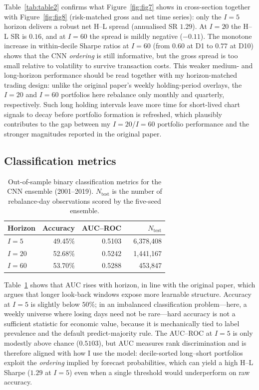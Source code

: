 \documentclass{article}
\begin{document}
Table~\ref{tab:table2} confirms what Figure~\ref{fig:fig7} shows in cross-section together with Figure~\ref{fig:fig8} (risk-matched gross and net time series): only the $I=5$
horizon delivers a
robust net H--L spread (annualised SR $1.29$). At $I=20$ the H--L SR is
$0.16$, and at $I=60$ the spread is mildly negative ($-0.11$). The
monotone increase in within-decile Sharpe ratios at $I=60$ (from $0.60$
at D1 to $0.77$ at D10) shows that the CNN \emph{ordering} is still
informative, but the gross spread is too small relative to volatility to
survive transaction costs. This weaker medium- and long-horizon performance
should be read together with my horizon-matched trading design: unlike the
original paper's weekly holding-period overlays, the $I=20$ and $I=60$
portfolios here rebalance only monthly and quarterly, respectively. Such long
holding intervals leave more time for short-lived chart signals to decay before
portfolio formation is refreshed, which plausibly contributes to the gap between
my $I=20$/$I=60$ portfolio performance and the stronger magnitudes reported in
the original paper.

\subsection{Classification metrics}

\begin{table}[H]
  \centering
  \caption{Out-of-sample binary classification metrics for the CNN
    ensemble (2001--2019). $N_{\mathrm{test}}$ is the number of rebalance-day
    observations scored by the five-seed ensemble.\label{tab:classmetrics}}
  \small
  \begin{tabular}{lrrr}
    \toprule
    Horizon & Accuracy & AUC--ROC & $N_{\mathrm{test}}$ \\
    \midrule
    $I=5$  & 49.45\% & 0.5103 & 6{,}378{,}408 \\
    $I=20$ & 52.68\% & 0.5242 & 1{,}441{,}167 \\
    $I=60$ & 53.70\% & 0.5288 & ~~~453{,}847 \\
    \bottomrule
  \end{tabular}
\end{table}

Table~\ref{tab:classmetrics} shows that AUC rises with horizon, in line
with the original paper, which argues that longer look-back windows expose
more learnable structure. Accuracy at $I=5$ is slightly below $50\%$; in an
imbalanced classification problem---here, a weekly universe where losing days need
not be rare---hard accuracy is not a sufficient statistic for economic value,
because it is mechanically tied to label prevalence and the default
predict-majority rule. The AUC--ROC at $I=5$ is only modestly above
chance ($0.5103$), but AUC measures rank discrimination and is therefore aligned
with how I use the model: decile-sorted long--short portfolios exploit the
\emph{ordering} implied by forecast probabilities, which can yield a high H--L
Sharpe ($1.29$ at $I=5$) even when a single threshold would underperform on raw
accuracy.
\end{document}
